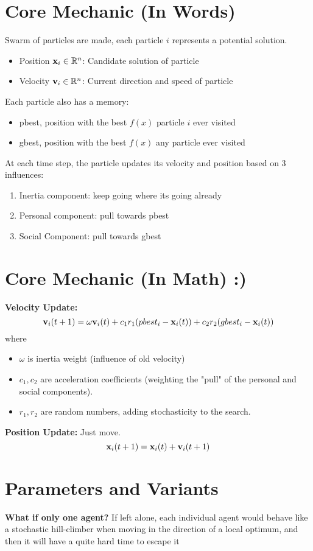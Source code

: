 \section*{Core Mechanic (In Words)}

Swarm of particles are made, each particle $i$ represents a potential solution. 

\begin{itemize}
    \item Position $\mathbf{x}_i \in \mathbb{R}^n$: Candidate solution of particle
    \item Velocity $\mathbf{v}_i \in \mathbb{R}^n$: Current direction and speed of particle 
\end{itemize}

Each particle also has a memory:
\begin{itemize}
    \item pbest, position with the best $f(x)$ particle $i$ ever visited
    \item gbest, position with the best $f(x)$ any particle ever visited
\end{itemize}

At each time step, the particle updates its velocity and position based on 
3 influences:
\begin{enumerate}
    \item Inertia component: keep going where its going already
    \item Personal component: pull towards pbest 
    \item Social Component: pull towards gbest 
\end{enumerate}

\section*{Core Mechanic (In Math) :)}
\textbf{Velocity Update:} 
\[
\mathbf{v}_i(t+1) = \omega \mathbf{v}_i(t) + c_1 r_1 (pbest_i - \mathbf{x}_i(t)) + c_2 r_2 (gbest_i - \mathbf{x}_i(t))
\]
where 
\begin{itemize}
    \item $\omega$ is inertia weight (influence of old velocity)
    \item $c_1,c_2$ are acceleration coefficients (weighting the "pull" of the personal and social components).
    \item $r_1,r_2$ are random numbers, adding stochasticity to the search.
\end{itemize}

\textbf{Position Update:} 
Just move. 
\[
\mathbf{x}_i(t+1) = \mathbf{x}_i(t) + \mathbf{v}_i(t+1)
\]

\section*{Parameters and Variants}

\textbf{What if only one agent?}
If left alone, each individual agent would behave like a stochastic hill-climber when moving
in the direction of a local optimum, and then it will have a quite hard time to escape it